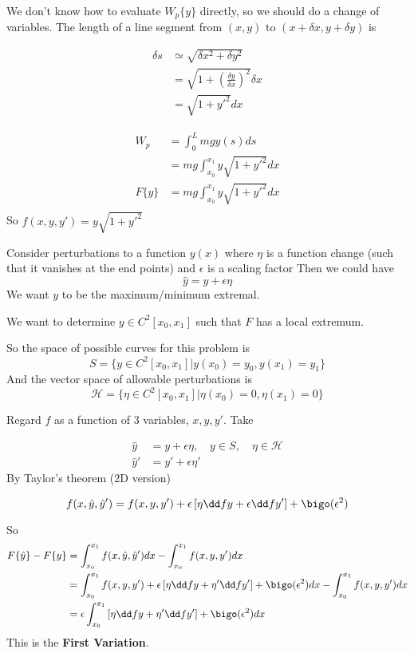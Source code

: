 \documentclass{X:/Documents/Coding/Latex/myassignment}
\begin{document}
We don't know how to evaluate $W_p\{y\}$ directly, so we should do a change of variables. The length of a line segment from $(x,y)$ to $(x+\delta x, y+\delta y)$ is

\begin{align*}
	\delta s &\simeq \sqrt{\delta x^2 + \delta y^2}\\
	&= \sqrt{1 + \left(\frac{\delta y}{\delta x}\right)^2 } \delta x\\
	&= \sqrt{1 + y'^2} dx
\end{align*}


\begin{align*}
	W_p &= \int_0^L mgy(s) ds\\
	&= mg \int_{x_0}^{x_1} y\sqrt{1+y'^2} dx\\
	F\{y\} &= mg \int_{x_0}^{x_1} y\sqrt{1+y'^2} dx\\
\end{align*}
So $f(x,y,y') = y\sqrt{1+y'^2} $

Consider perturbations to a function $y(x)$ where $\eta$ is a function change (such that it vanishes at the end points) and $\epsilon$ is a scaling factor
Then we could have
\[\hat{y} = y + \epsilon \eta\]
We want $y$ to be the maximum/minimum extremal.

We want to determine $y \in C^2[x_0,x_1]$ such that $F$ has a local extremum.

So the space of possible curves for this problem is
\[S = \{y \in C^2 [x_0,x_1] | y(x_0) = y_0, y(x_1) = y_1\}\]
And the vector space of allowable perturbations is
\[\mathcal{H} = \{\eta \in C^2 [x_0,x_1] | \eta(x_0) = 0, \eta(x_1) = 0\}\]

Regard $f$ as a function of $3$ variables, $x,y,y'$.
Take 

\begin{align*}
	\hat{y} &= y + \epsilon \eta, \quad y\in S, \quad \eta \in \mathcal{H}\\
	\hat{y}' &= y' + \epsilon \eta'	
\end{align*}
By Taylor's theorem (2D version)

\[f(x,\hat{y},\hat{y}') = f(x,y,y') + \epsilon \left[\eta \dd fy + \epsilon \dd f{y'}\right] +\bigo(\epsilon^2)\]

So
\begin{align*}
	F\{\hat{y}\} - F\{y\} &= \int_{x_0}^{x_1} f(x,\hat{y},\hat{y}') dx - \int_{x_0}^{x_1} f(x,y,y') dx\\
	&=\int_{x_0}^{x_1} f(x,y,y') + \epsilon \left[\eta \dd fy + \eta' \dd f{y'}\right] +\bigo(\epsilon^2) dx - \int_{x_0}^{x_1} f(x,y,y') dx\\
	&=\epsilon \int_{x_0}^{x_1}\left[\eta \dd fy + \eta' \dd f{y'}\right] +\bigo(\epsilon^2) dx\\ 
\end{align*}
This is the \textbf{First Variation}.
\end{document}
